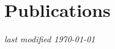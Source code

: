 \documentclass[11pt]{article}
\makeatletter
\let\saved@bibitem\@bibitem
\makeatother
\begin{document}
  \begingroup
    \makeatletter
    \let\@bibitem\saved@bibitem
  \endgroup



  \section{Publications}

  { \setlength{\parskip}{2.5ex}


    
  }



\begin{center} 
\vspace{\fill}
\small \it last modified \today
\end{center}
\end{document}
